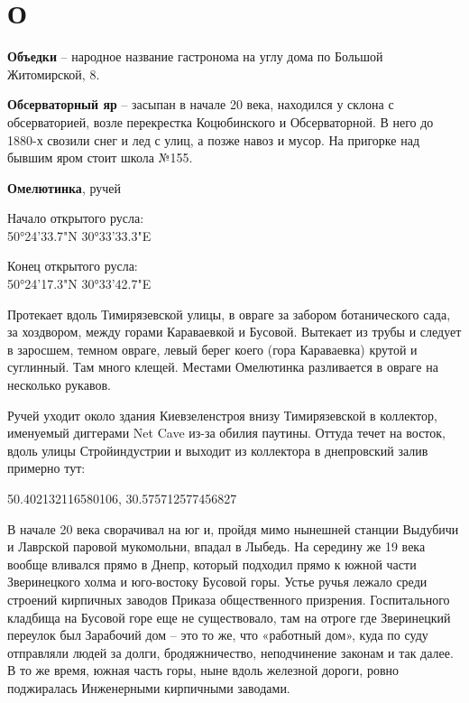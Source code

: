 \chapter*{О}

\textbf{Объедки} – народное название гастронома на углу дома по Большой Житомирской, 8.\\

\medskip

\textbf{Обсерваторный яр} – засыпан в начале 20 века, находился у склона с обсерваторией, возле перекрестка Коцюбинского и Обсерваторной. В него до 1880-х свозили снег и лед с улиц, а позже навоз и мусор. На пригорке над бывшим яром стоит школа №155.\\

\medskip

\textbf{Омелютинка}, ручей

Начало открытого русла:\\50°24'33.7"N 30°33'33.3"E

Конец открытого русла:\\ 50°24'17.3"N 30°33'42.7"E

Протекает вдоль Тимирязевской улицы, в овраге за забором ботанического сада, за хоздвором, между горами Караваевкой и Бусовой. Вытекает из трубы и следует в заросшем, темном овраге, левый берег коего (гора Караваевка) крутой и суглинный. Там много клещей. Местами Омелютинка разливается в овраге на несколько рукавов.

Ручей уходит около здания Киевзеленстроя внизу Тимирязевской в коллектор, именуемый диггерами Net Cave из-за обилия паутины. Оттуда течет на восток, вдоль улицы Стройиндустрии и выходит из коллектора в днепровский залив примерно тут:

50.402132116580106, 30.575712577456827

В начале 20 века сворачивал на юг и, пройдя мимо нынешней станции Выдубичи и Лаврской паровой мукомольни, впадал в Лыбедь. На середину же 19 века вообще вливался прямо в Днепр, который подходил прямо к южной части Зверинецкого холма и юго-востоку Бусовой горы. Устье ручья лежало среди строений кирпичных заводов Приказа общественного призрения. Госпитального кладбища на Бусовой горе еще не существовало, там на отроге где Зверинецкий переулок был Зарабочий дом – это то же, что «работный дом», куда по суду отправляли людей за долги, бродяжничество, неподчинение законам и так далее. В то же время, южная часть горы, ныне вдоль железной дороги, ровно поджиралась Инженерными кирпичными заводами.


